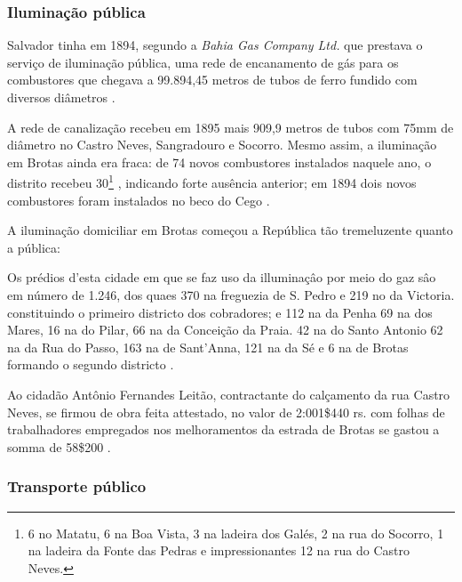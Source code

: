 \subsubsection{Iluminação pública}


Salvador tinha em 1894, segundo a \textit{Bahia Gas Company Ltd.} que prestava o serviço de iluminação pública, uma rede de encanamento de gás para os combustores que chegava a 99.894,45 metros de tubos de ferro fundido com diversos diâmetros \cite[p.~178]{salvador_relatorio_1894}.

A rede de canalização recebeu em 1895 mais 909,9 metros de tubos com 75mm de diâmetro no Castro Neves, Sangradouro e Socorro. Mesmo assim, a iluminação em Brotas ainda era fraca: de 74 novos combustores instalados naquele ano, o distrito recebeu 30\footnote{6 no Matatu, 6 na Boa Vista, 3 na ladeira dos Galés, 2 na rua do Socorro, 1 na ladeira da Fonte das Pedras e impressionantes 12 na rua do Castro Neves.} \cite[pp.~149-150]{salvador_relatorio_1896}, indicando forte ausência anterior; em 1894 dois novos combustores foram instalados no beco do Cego \cite[p.~179]{salvador_relatorio_1894}.

A iluminação domiciliar em Brotas começou a República tão tremeluzente quanto a pública:

\begin{citacao}
Os prédios d'esta cidade em que se faz uso da illuminaçâo por meio do gaz sâo em número de 1.246, dos quaes 370 na freguezia de S. Pedro e 219 no da Victoria. constituindo o primeiro districto dos cobradores; e 112 na da Penha 69 na dos Mares, 16 na do Pilar, 66 na da Conceição da Praia. 42 na do Santo Antonio 62 na da Rua do Passo, 163 na de Sant'Anna, 121 na da Sé e 6 na de Brotas formando o segundo districto \cite[p.~151]{salvador_relatorio_1896}. 
\end{citacao}

\begin{citacao}
Ao cidadão Antônio Fernandes Leitão, contractante do calçamento da rua Castro Neves, se firmou de obra feita attestado, no valor de 2:001\$440 rs. com folhas de trabalhadores empregados nos melhoramentos da estrada de Brotas se gastou a somma de 58\$200 \cite[p.~]{salvador_relatorio_1896}.
\end{citacao}



\subsubsection{Transporte público}

